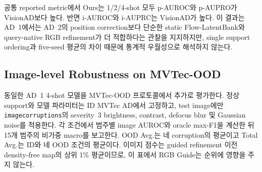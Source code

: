 공통 reported metric에서 Ours는 1/2/4-shot 모두 p-AUROC와 p-AUPRO가
VisionAD보다 높다. 반면 i-AUROC와 i-AUPRC는 VisionAD가 높다. 이 결과는
AD~1에서는 AD~2의 position correction보다 단순한 static Flow-LatentBank와
query-native RGB refinement가 더 적합하다는 관찰을 지지하지만, single support
ordering과 five-seed 평균의 차이 때문에 통계적 우월성으로 해석하지 않는다.

\subsection{Image-level Robustness on MVTec-OOD}

동일한 AD~1 4-shot 모델을 MVTec-OOD 프로토콜에서 추가로 평가한다. 정상
support와 모델 파라미터는 ID MVTec AD에서 고정하고, test image에만
\texttt{imagecorruptions}의 severity~3 brightness, contrast, defocus blur 및
Gaussian noise를 적용한다. 각 조건에서 범주별 image AUROC와 oracle max-F1을
계산한 뒤 15개 범주의 비가중 macro를 보고한다. OOD Avg.는 네 corruption의
평균이고 Total Avg.는 ID와 네 OOD 조건의 평균이다. 이미지 점수는 guided
refinement 이전 density-free map의 상위 1\% 평균이므로, 이 표에서 RGB Guide는
순위에 영향을 주지 않는다.

\begin{table}[t]
  \centering
  \caption{MVTec AD와 MVTec-OOD의 image-level AUROC/Img-F1 (\%). 기존 방법
  수치는 DIRNet의 reported comparison에서 가져왔다. Ours는 frozen DINOv2-R
  ViT-B/14를 사용하는 4-shot 결과인 반면, 기존 행은 full-normal 설정이므로
  동일한 normal-data budget의 직접 비교가 아니다.}
  \label{tab:mvtecad_ood_image_robustness}
  \small
\end{table}

